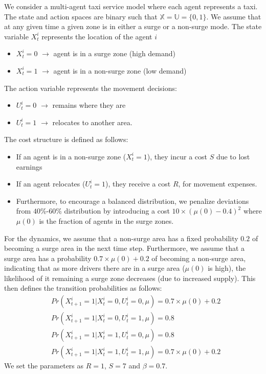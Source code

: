 \documentclass[twoside,11pt]{article}
\begin{document}
We consider a multi-agent taxi service model where each agent represents a taxi. The state and action spaces are binary such that $\mathds{X}=\mathds{U}=\{0,1\}$. We assume that at any given time a given zone is in either a surge or a non-surge mode. The state variable $X_t^i$ represents the location of the agent $i$
\begin{itemize}
\item $X_t^i=0$ $\rightarrow$ agent is in a surge zone (high demand)
\item $X_t^i=1$ $\rightarrow$ agent is in a non-surge zone (low demand)
\end{itemize}
The action variable represents the movement decisions:
\begin{itemize}
\item $U_t^i=0$ $\rightarrow$ remains where they are
\item $U_t^i=1$ $\rightarrow$ relocates to another area.
\end{itemize}
The cost structure is defined as follows:
\begin{itemize}
\item If an agent is in a non-surge zone ($X_t^i=1$),  they incur a cost 
$S$ due to lost earnings
\item If an agent relocates ($U_t^i=1$), they receive a cost $R$, for movement expenses.
\item Furthermore, to encourage a balanced distribution, we penalize deviations from  $40$\%-$60$\% distribution by introducing a cost $10\times (\mu(0)-0.4)^2$ where $\mu(0)$ is the fraction of agents in the surge zones. 
\end{itemize}

For the dynamics, we assume that a non-surge area has a fixed probability $0.2$ of becoming a surge area in the next time step. Furthermore, we assume that a surge area has a probability $0.7\times\mu(0)+0.2$ of becoming a non-surge area, indicating that as more drivers there are in a surge area ($\mu(0)$ is high), the likelihood of it remaining a surge zone decreases (due to increased supply). This then defines the transition probabilities as follows:
\begin{align*}
&Pr(X_{t+1}^i=1|X_t^i=0,U_t^i=0,\mu)=0.7\times\mu(0)+0.2\\
&Pr(X_{t+1}^i=1|X_t^i=0,U_t^i=1,\mu)=0.8\\
&Pr(X_{t+1}^i=1|X_t^i=1,U_t^i=0,\mu)=0.8\\
&Pr(X_{t+1}^i=1|X_t^i=1,U_t^i=1,\mu)=0.7\times\mu(0)+0.2
\end{align*}
We set the parameters as $R=1$, $S=7$ and $\beta=0.7$. 
\end{document}
